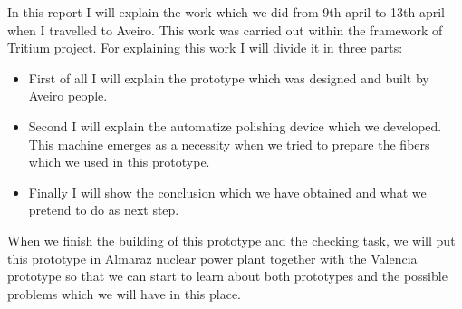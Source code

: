In this report I will explain the work which we did from 9th april to 13th april when I travelled to Aveiro. This work was carried out within the framework of Tritium project. For explaining this work I will divide it in three parts:
\begin{itemize}
\item{} First of all I will explain the prototype which was designed and built by Aveiro people. 
\item{} Second I will explain the automatize polishing device which we developed. This machine emerges as a necessity when we tried to prepare the fibers which we used in this prototype. 
\item{} Finally I will show the conclusion which we have obtained and what we pretend to do as next step.
\end{itemize}
When we finish the building of this prototype and the checking task, we will put this prototype in Almaraz nuclear power plant together with the Valencia prototype so that we can start to learn about both prototypes and the possible problems which we will have in this place.
